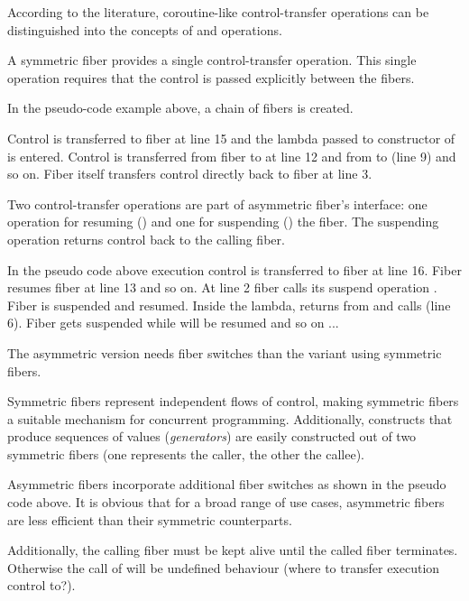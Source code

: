 
According to the literature\cite{Moura2009}, coroutine-like control-transfer
operations can be distinguished into the concepts of \sym and \asym
operations.

 A symmetric fiber provides a single
control-transfer operation. This single operation requires that the control is
passed explicitly between the fibers.


In the pseudo-code example above, a chain of fibers is created.

Control is transferred to fiber  at line 15 and the lambda
passed to constructor of  is entered. Control is transferred from
fiber  to  at line 12 and from  to  (line 9) and
so on. Fiber  itself transfers control directly back to
fiber  at line 3.

 Two control-transfer operations are part of
asymmetric fiber's interface: one operation for resuming (\resume) and one for
suspending () the fiber. The suspending operation returns
control back to the calling fiber.

In the pseudo code above execution control is transferred to fiber  at
line 16. Fiber  resumes fiber  at line 13 and so on. At line 2
fiber  calls its suspend operation . Fiber 
is suspended and  resumed. Inside the lambda,  returns from
 and calls  (line 6). Fiber  gets
suspended while  will be resumed and so on ...

The asymmetric version needs  fiber switches than the variant
using symmetric fibers.


Symmetric fibers represent independent flows of control, making symmetric
fibers a suitable mechanism for concurrent programming. Additionally,
constructs that produce sequences of values (\emph{generators}) are easily
constructed out of two symmetric fibers (one represents the caller, the other
the callee).

Asymmetric fibers incorporate additional fiber switches as shown in the pseudo
code above. It is obvious that for a broad range of use cases, asymmetric
fibers are less efficient than their symmetric counterparts.

Additionally, the calling fiber must be kept alive until the called fiber
terminates. Otherwise the call of  will be undefined behaviour
(where to transfer execution control to?).

